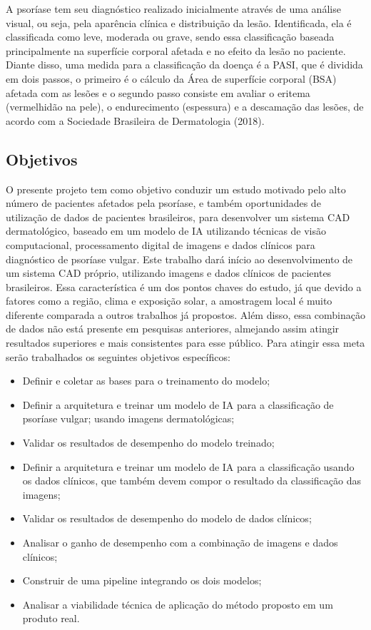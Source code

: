 A psoríase tem seu diagnóstico realizado inicialmente através de uma análise visual, ou seja, pela aparência clínica e distribuição da lesão. Identificada, ela é classificada como leve, moderada ou grave, sendo essa classificação baseada principalmente na superfície corporal afetada e no efeito da lesão no paciente. Diante disso, uma medida para a classificação da doença é a \ac{PASI}, que é dividida em dois passos, o primeiro é o cálculo da Área de superfície corporal (BSA) afetada com as lesões e o segundo passo consiste em avaliar o eritema (vermelhidão na pele), o endurecimento (espessura) e a descamação das lesões, de acordo com a Sociedade Brasileira de Dermatologia (2018).

\subsection{Objetivos}
O presente projeto tem como objetivo conduzir um estudo motivado pelo alto número de pacientes afetados pela psoríase, e também oportunidades de utilização de dados de pacientes brasileiros, para desenvolver um sistema \acs{CAD} dermatológico, baseado em um modelo de \acs{IA} utilizando técnicas de visão computacional, processamento digital de imagens e dados clínicos para diagnóstico de psoríase vulgar. Este trabalho dará início ao desenvolvimento de um sistema \acs{CAD} próprio,  utilizando imagens e dados clínicos de pacientes brasileiros. Essa característica é um dos pontos chaves do estudo, já que devido a fatores como a região, clima e exposição solar, a amostragem local é muito diferente comparada a outros trabalhos já propostos. Além disso,  essa combinação de dados não está presente em pesquisas anteriores, almejando assim atingir resultados superiores e mais consistentes para esse público. Para atingir essa meta serão trabalhados os seguintes objetivos específicos:
\begin{itemize}
  \item Definir e coletar as bases para o treinamento do modelo;
  \item Definir a arquitetura e treinar um modelo de \acs{IA} para a classificação de psoríase vulgar; usando imagens dermatológicas;
  \item Validar os resultados de desempenho do modelo treinado;
  \item Definir a arquitetura e treinar um modelo de \acs{IA} para a classificação usando os dados clínicos, que também devem compor o resultado da classificação das imagens;

  \item Validar os resultados de desempenho do modelo de dados clínicos;
  \item Analisar o ganho de desempenho com a combinação de imagens e dados clínicos;
  \item Construir de uma pipeline integrando os dois modelos;
  \item Analisar a viabilidade técnica de aplicação do método proposto em um produto real.

\end{itemize}

